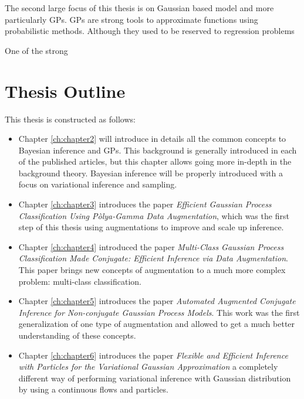 The second large focus of this thesis is on Gaussian based model and more particularly \acf{GPs}.
\ac{GPs} are strong tools to approximate functions using probabilistic methods.
Although they used to be reserved to regression problems 

One of the strong

\section{Thesis Outline}

This thesis is constructed as follows:
\begin{itemize}
    \item Chapter \ref{ch:chapter2} will introduce in details all the common concepts to Bayesian inference and \ac{GPs}.
          This background is generally introduced in each of the published articles, but this chapter allows going more in-depth in the background theory.
          Bayesian inference will be properly introduced with a focus on variational inference and sampling.
    \item Chapter \ref{ch:chapter3} introduces the paper \textit{Efficient Gaussian Process Classification Using P\`olya-Gamma Data Augmentation}, which was the first step of this thesis using augmentations to improve and scale up inference.
    \item Chapter \ref{ch:chapter4} introduced the paper \textit{Multi-Class Gaussian Process Classification Made Conjugate: Efficient Inference via Data Augmentation}.
          This paper brings new concepts of augmentation to a much more complex problem: multi-class classification.
    \item Chapter \ref{ch:chapter5} introduces the paper \textit{Automated Augmented Conjugate Inference for Non-conjugate Gaussian Process Models}.
          This work was the first generalization of one type of augmentation and allowed to get a much better understanding of these concepts.
    \item Chapter \ref{ch:chapter6} introduces the paper \textit{Flexible and Efficient Inference with Particles for the Variational Gaussian Approximation } a completely different way of performing variational inference with Gaussian distribution by using a continuous flows and particles.

\end{itemize}

